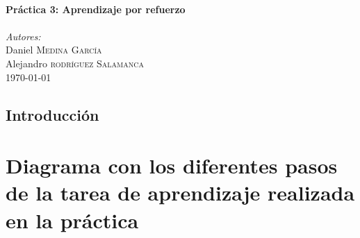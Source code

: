 \documentclass[12pt]{article}
\begin{document}
\begin{titlepage}
\HRule \\[0.7cm]
{ \huge \bfseries Práctica 3: Aprendizaje por refuerzo}\\[0.4cm] %
\HRule \\[0.7cm]


\textit{Autores:}\\
Daniel \textsc{Medina García}\\ %
Alejandro \textsc{rodríguez Salamanca}\\[1.1cm] %


{\large \today}\\ %


\vfill %

\end{titlepage}

\tableofcontents

\newpage
\thispagestyle{empty}
\clearpage
\vspace*{\fill}
\begin{center}
    \begin{minipage}{\textwidth}
        \begin{center}
            \section*{Introducción}


        \end{center}
    \end{minipage}
\end{center}
\vfill

\newpage

\section{Diagrama con los diferentes pasos de la tarea de aprendizaje realizada en la práctica}
\end{document}
